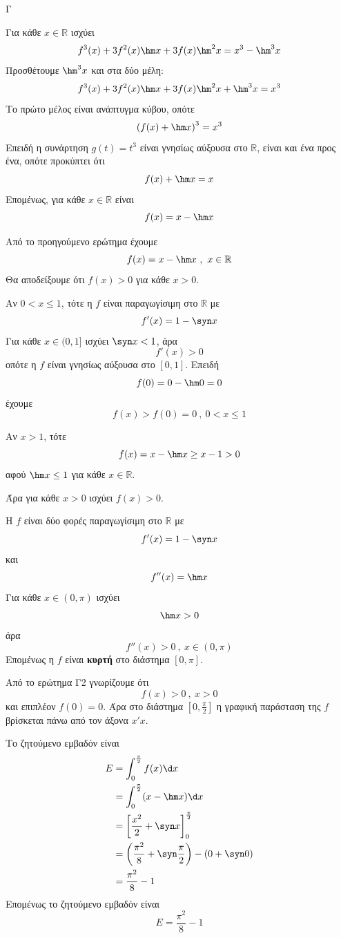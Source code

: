 \begin{thema}{Γ}
\begin{erwthma}
\item Για κάθε $x\in\mathbb{R}$ ισχύει
\[f^3(x)+3f^2(x)\hm x+3f(x)\hm^2 x=x^3-\hm^3 x\]
Προσθέτουμε $\hm^3 x$ και στα δύο μέλη:
\[f^3(x)+3f^2(x)\hm x+3f(x)\hm^2 x+\hm^3 x=x^3\]
Το πρώτο μέλος είναι ανάπτυγμα κύβου, οπότε
\[\left(f(x)+\hm x\right)^3=x^3\]
Επειδή η συνάρτηση $g(t)=t^3$ είναι γνησίως αύξουσα στο $\mathbb{R}$, είναι και ένα προς ένα, οπότε προκύπτει ότι
\[f(x)+\hm x=x\]
Επομένως, για κάθε $x\in\mathbb{R}$ είναι
\[f(x)=x-\hm x\]

\item Από το προηγούμενο ερώτημα έχουμε
\[f(x)=x-\hm x\ ,\ x\in\mathbb{R}\]
Θα αποδείξουμε ότι $f(x)>0$ για κάθε $x>0$.

Αν $0<x\leq 1$, τότε η $f$ είναι παραγωγίσιμη στο $\mathbb{R}$ με
\[f'(x)=1-\syn x\]
Για κάθε $x\in(0,1]$ ισχύει $\syn x<1$, άρα
\[f'(x)>0\]
οπότε η $f$ είναι γνησίως αύξουσα στο $[0,1]$. Επειδή
\[f(0)=0-\hm 0=0\]
έχουμε
\[f(x)>f(0)=0\ ,\ 0<x\leq 1\]

Αν $x>1$, τότε
\[f(x)=x-\hm x\geq x-1>0\]
αφού $\hm x\leq 1$ για κάθε $x\in\mathbb{R}$.

Άρα για κάθε $x>0$ ισχύει $f(x)>0$.

\item Η $f$ είναι δύο φορές παραγωγίσιμη στο $\mathbb{R}$ με
\[f'(x)=1-\syn x\]
και
\[f''(x)=\hm x\]
Για κάθε $x\in(0,\pi)$ ισχύει
\[\hm x>0\]
άρα
\[f''(x)>0\ ,\ x\in(0,\pi)\]
Επομένως η $f$ είναι \textbf{κυρτή} στο διάστημα $[0,\pi]$.

\item Από το ερώτημα Γ2 γνωρίζουμε ότι
\[f(x)>0\ ,\ x>0\]
και επιπλέον $f(0)=0$. Άρα στο διάστημα $\left[0,\frac{\pi}{2}\right]$ η γραφική παράσταση της $f$ βρίσκεται πάνω από τον άξονα $x'x$.

Το ζητούμενο εμβαδόν είναι
\begin{align*}
E&=\dint_0^{\frac{\pi}{2}} f(x)\d x\\
&=\dint_0^{\frac{\pi}{2}}(x-\hm x)\d x\\
&=\left[\frac{x^2}{2}+\syn x\right]_0^{\frac{\pi}{2}}\\
&=\left(\frac{\pi^2}{8}+\syn\frac{\pi}{2}\right)-\left(0+\syn 0\right)\\
&=\frac{\pi^2}{8}-1
\end{align*}
Επομένως το ζητούμενο εμβαδόν είναι
\[E=\frac{\pi^2}{8}-1\]
\end{erwthma}
\end{thema}

